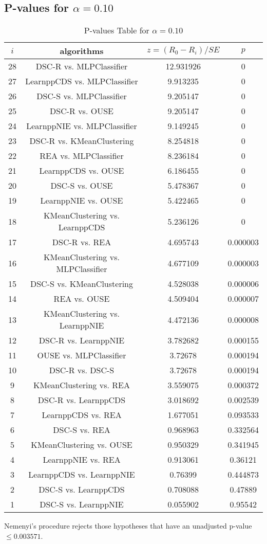 \documentclass[a4paper,10pt]{article}
\begin{document}
\begin{landscape}
\pagebreak

\subsection{P-values for $\alpha=0.10$}

\begin{table}[!htp]
\centering\scriptsize
\begin{tabular}{cccc}
$i$&algorithms&$z=(R_0 - R_i)/SE$&$p$\\
\hline28&DSC-R vs. MLPClassifier&12.931926&0\\
27&LearnppCDS vs. MLPClassifier&9.913235&0\\
26&DSC-S vs. MLPClassifier&9.205147&0\\
25&DSC-R vs. OUSE&9.205147&0\\
24&LearnppNIE vs. MLPClassifier&9.149245&0\\
23&DSC-R vs. KMeanClustering&8.254818&0\\
22&REA vs. MLPClassifier&8.236184&0\\
21&LearnppCDS vs. OUSE&6.186455&0\\
20&DSC-S vs. OUSE&5.478367&0\\
19&LearnppNIE vs. OUSE&5.422465&0\\
18&KMeanClustering vs. LearnppCDS&5.236126&0\\
17&DSC-R vs. REA&4.695743&0.000003\\
16&KMeanClustering vs. MLPClassifier&4.677109&0.000003\\
15&DSC-S vs. KMeanClustering&4.528038&0.000006\\
14&REA vs. OUSE&4.509404&0.000007\\
13&KMeanClustering vs. LearnppNIE&4.472136&0.000008\\
12&DSC-R vs. LearnppNIE&3.782682&0.000155\\
11&OUSE vs. MLPClassifier&3.72678&0.000194\\
10&DSC-R vs. DSC-S&3.72678&0.000194\\
9&KMeanClustering vs. REA&3.559075&0.000372\\
8&DSC-R vs. LearnppCDS&3.018692&0.002539\\
7&LearnppCDS vs. REA&1.677051&0.093533\\
6&DSC-S vs. REA&0.968963&0.332564\\
5&KMeanClustering vs. OUSE&0.950329&0.341945\\
4&LearnppNIE vs. REA&0.913061&0.36121\\
3&LearnppCDS vs. LearnppNIE&0.76399&0.444873\\
2&DSC-S vs. LearnppCDS&0.708088&0.47889\\
1&DSC-S vs. LearnppNIE&0.055902&0.95542\\
\hline
\end{tabular}
\caption{P-values Table for $\alpha=0.10$}
\end{table}Nemenyi's procedure rejects those hypotheses that have an unadjusted p-value $\le0.003571$.


\end{landscape}
\end{document}
